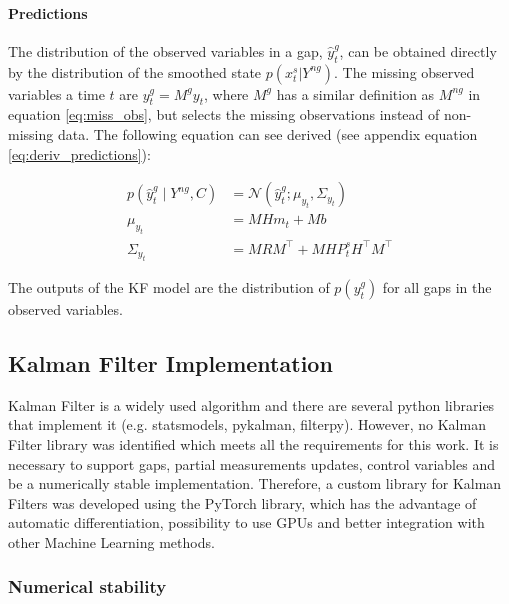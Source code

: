\documentclass{article}
\newcommand{\norm}[3]{\mathcal{N}\left(#1; #2, #3\right)} %
\let\Oldsubsection\subsection
\renewcommand{\subsection}{\FloatBarrier\Oldsubsection}
\begin{document}
\paragraph{Predictions}

The distribution of the observed variables in a gap, $\hat{y}^g_t$, can be obtained directly by the distribution of the smoothed state $p(x_t^s | Y^{ng})$.
The missing observed variables a time $t$ are $y^g_t = M^gy_t$, where $M^{g}$ has a similar definition as $M^{ng}$ in equation \ref{eq:miss_obs}, but selects the missing observations instead of  non-missing data.
The following equation can see derived (see appendix equation \ref{eq:deriv_predictions}):

\begin{equation}
\begin{aligned}\label{eq:filter_predictions}
    p(\hat{y}^g_t \mid Y^{ng}, C) &= \norm{\hat{y}^g_t}{\mu_{y_t}}{\Sigma_{y_t}} \\
    \mu_{y_t} &= MHm_t + Mb \\
    \Sigma_{y_t} &= MRM^\top + MHP^s_tH^\top M^\top
\end{aligned}
\end{equation}

The outputs of the KF model are the distribution of $p(y^g_t)$ for all gaps in the observed variables. 

\subsection{Kalman Filter Implementation}


Kalman Filter is a widely used algorithm and there are several python libraries that implement it (e.g. \textsf{statsmodels}, \textsf{pykalman}, \textsf{filterpy}). However, no  Kalman Filter library was identified which meets all the requirements for this work. It is necessary to support gaps, partial measurements updates, control variables and be a numerically stable implementation.
Therefore, a custom library for Kalman Filters was developed using the \textsf{PyTorch} library, which has the advantage of automatic differentiation, possibility to use GPUs and better integration with other Machine Learning methods.

\subsubsection{Numerical stability}
\end{document}
